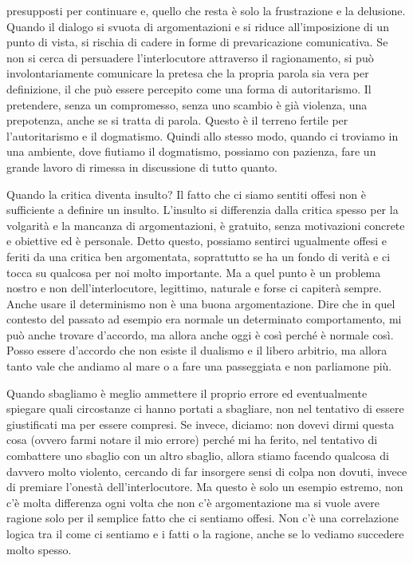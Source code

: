 \documentclass[12pt]{book} %
\begin{document}
presupposti per continuare e, quello che resta è solo la frustrazione e la delusione. 
Quando il dialogo si svuota di argomentazioni e si riduce all'imposizione di un punto di vista, si rischia di cadere in forme di prevaricazione comunicativa. Se non si cerca di persuadere l'interlocutore attraverso il ragionamento, si può involontariamente comunicare la pretesa che la propria parola sia vera per definizione, il che può essere percepito come una forma di autoritarismo. Il pretendere, senza un compromesso, senza uno scambio è già violenza, una
prepotenza, anche se si tratta di parola. Questo è il terreno fertile per
l'autoritarismo e il dogmatismo. Quindi allo stesso modo, quando ci troviamo in una ambiente, dove
fiutiamo il dogmatismo, possiamo con pazienza, fare un grande lavoro di rimessa in discussione di tutto quanto. 

Quando la critica diventa insulto? Il fatto che ci siamo sentiti offesi non è sufficiente a definire un insulto.
L'insulto si differenzia dalla critica spesso per la volgarità e la mancanza di argomentazioni, è
gratuito, senza motivazioni concrete e obiettive ed è personale. Detto questo, possiamo sentirci ugualmente offesi e feriti da una
critica ben argomentata, soprattutto se ha un fondo di verità e ci tocca su qualcosa per noi molto importante. Ma a quel
punto è un problema nostro e non dell'interlocutore, legittimo, naturale e forse ci capiterà sempre. 
Anche usare il determinismo non è una buona argomentazione. Dire che in quel contesto del passato ad esempio era normale un determinato comportamento, mi può anche trovare d'accordo, ma allora anche oggi è così perché è normale così. Posso essere d'accordo che non esiste il dualismo e il libero arbitrio, ma allora tanto vale che andiamo al mare o a fare una passeggiata e non parliamone più.

Quando sbagliamo è meglio ammettere il proprio errore ed eventualmente spiegare quali circostanze
ci hanno portati a sbagliare, non nel tentativo di essere giustificati ma per essere compresi. Se
invece, diciamo: non dovevi dirmi questa cosa (ovvero farmi notare il mio errore) perché
mi ha ferito, nel tentativo di combattere uno sbaglio con un altro sbaglio, allora stiamo facendo qualcosa di davvero
molto violento, cercando di far insorgere sensi di colpa non dovuti, invece di premiare l'onestà
dell'interlocutore. Ma questo è solo un esempio estremo, non c'è molta differenza ogni volta
che non c'è argomentazione ma si vuole avere ragione solo per il semplice fatto che ci sentiamo
offesi. Non c'è una correlazione logica tra il come ci sentiamo e i fatti o la ragione, anche se
lo vediamo succedere molto spesso.
\end{document}
